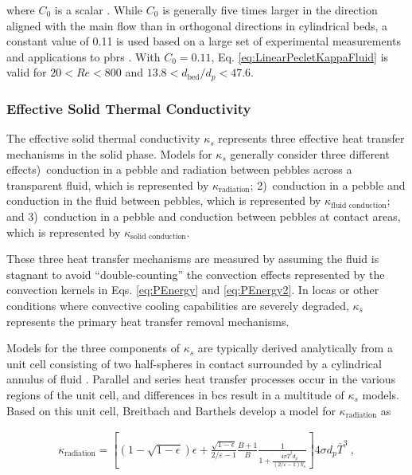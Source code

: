\noindent where \(C_0\) is a scalar \cite{yagi1957, schertz, tsotsas, yagi,amiri,amiri1995,delgado}. While \(C_0\) is generally five times larger in the direction aligned with the main flow than in orthogonal directions in cylindrical beds, a constant value of 0.11 is used based on a large set of experimental measurements and applications to \glspl{pbr} \cite{yagi1957,auwerda_2011,delgado,amiri1995,yagi,tsotsas}. With \(C_0=0.11\), Eq. \eqref{eq:LinearPecletKappaFluid} is valid for \(20<Re<800\) and \(13.8<d_\text{bed}/d_p<47.6\).

\subsubsection{Effective Solid Thermal Conductivity}
\label{sec:KappaS}

The effective solid thermal conductivity \(\kappa_s\) represents three effective heat transfer mechanisms in the solid phase. Models for \(\kappa_s\) generally consider three different effects)~conduction in a pebble and radiation between pebbles across a transparent fluid, which is represented by \(\kappa_\text{radiation}\); 2)~conduction in a pebble and conduction in the fluid between pebbles, which is represented by \(\kappa_\textrm{fluid conduction}\); and 3)~conduction in a pebble and conduction between pebbles at contact areas, which is represented by \(\kappa_\textrm{solid conduction}\).

These three heat transfer mechanisms are measured by assuming the fluid is stagnant to avoid ``double-counting'' the convection effects represented by the convection kernels in Eqs. \eqref{eq:PEnergy} and \eqref{eq:PEnergy2}. In \glspl{loca} or other conditions where convective cooling capabilities are severely degraded, \(\kappa_s\) represents the primary heat transfer removal mechanisms. 

Models for the three components of \(\kappa_s\) are typically derived analytically from a unit cell consisting of two half-spheres in contact surrounded by a cylindrical annulus of fluid \cite{breitbach}. Parallel and series heat transfer processes occur in the various regions of the unit cell, and differences in \glspl{bc} result in a multitude of \(\kappa_s\) models. Based on this unit cell, Breitbach and Barthels develop a model for \(\kappa_\text{radiation}\) as

\begin{equation}
\begin{aligned}
\label{eq:KappaRadiationBB}
\kappa_\text{radiation}=\left\lbrack\left(1-\sqrt{1-\epsilon}\right)\epsilon+\frac{\sqrt{1-\epsilon}}{2/\varepsilon-1}\frac{B+1}{B}\frac{1}{1+\frac{4\sigma\bar{T}^3d_p}{(2/\varepsilon-1)k_s}}\right\rbrack4\sigma d_p\bar{T}^{3}\ ,
\end{aligned}
\end{equation}

